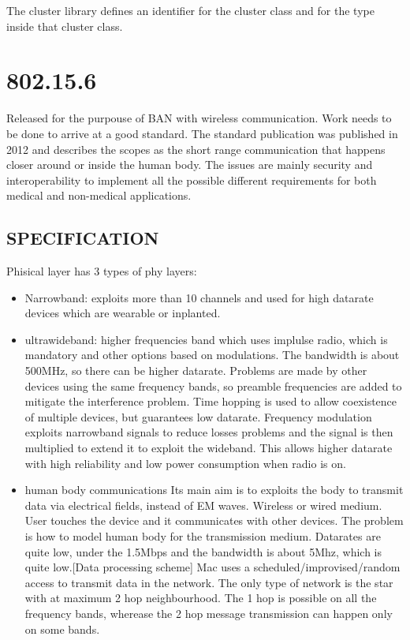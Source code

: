 The cluster library defines an identifier for the cluster class and for the type inside that cluster class.

\section{802.15.6}
Released for the purpouse of BAN with wireless communication. Work needs to be done to arrive at a good standard. The standard publication was published in 2012 and describes the scopes as the short range communication that happens closer around or inside the human body. The issues are mainly security and interoperability to implement all the possible different requirements for both medical and non-medical applications.

\subsection{SPECIFICATION}
Phisical layer has 3 types of phy layers:
\begin{itemize}
  \item Narrowband: exploits more than 10 channels and used for high datarate devices which are wearable or inplanted.
  \item ultrawideband: higher frequencies band which uses implulse radio, which is mandatory and other options based on modulations. The bandwidth is about 500MHz, so there can be higher datarate. Problems are made by other devices using the same frequency bands, so preamble frequencies are added to mitigate the interference problem. Time hopping is used to allow coexistence of multiple devices, but guarantees low datarate. Frequency modulation exploits narrowband signals to reduce losses problems and the signal is then multiplied to extend it to exploit the wideband. This allows higher datarate with high reliability and low power consumption when radio is on.
  \item human body communications Its main aim is to exploits the body to transmit data via electrical fields, instead of EM waves. Wireless or wired medium. User touches the device and it communicates with other devices. The problem is how to model human body for the transmission medium. Datarates are quite low, under the 1.5Mbps and the bandwidth is about 5Mhz, which is quite low.[Data processing scheme] Mac uses a scheduled/improvised/random access to transmit data in the network. The only type of network is the star with at maximum 2 hop neighbourhood. The 1 hop is possible on all the frequency bands, wherease the 2 hop message transmission can happen only on some bands.
\end{itemize}

